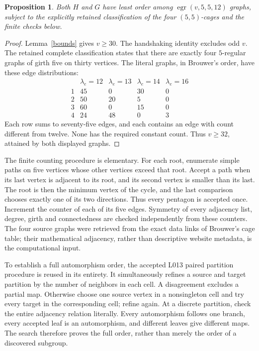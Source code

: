 \documentclass[11pt,a4paper]{article}
\newtheorem{proposition}[theorem]{Proposition}
\begin{document}
\begin{proposition}\label{small}
Both $H$ and $G$ have least order among $\operatorname{egr}(v,5,5,12)$
graphs, subject to the explicitly retained classification of the four
$(5,5)$-cages and the finite checks below.
\end{proposition}
\begin{proof}
Lemma~\ref{bounds} gives $v\geq30$. The handshaking identity excludes
odd $v$. The retained complete classification states that there are
exactly four $5$-regular graphs of girth five on thirty vertices.
The literal graphs, in Brouwer's order, have these edge distributions:
\[
\begin{array}{c|rrrr}
 &\lambda_e=12&\lambda_e=13&\lambda_e=14&\lambda_e=16\\\hline
 1&45&0&30&0\\
 2&50&20&5&0\\
 3&60&0&15&0\\
 4&24&48&0&3
\end{array}
\]
Each row sums to seventy-five edges, and each contains an edge with
count different from twelve. None has the required constant count.
Thus $v\geq32$, attained by both displayed graphs.
\end{proof}

The finite counting procedure is elementary. For each root, enumerate
simple paths on five vertices whose other vertices exceed that root.
Accept a path when its last vertex is adjacent to its root, and its
second vertex is smaller than its last. The root is then the minimum
vertex of the cycle, and the last comparison chooses exactly one of its
two directions. Thus every pentagon is accepted once. Increment the
counter of each of its five edges. Symmetry of every adjacency list,
degree, girth and connectedness are checked independently from these
counters. The four source graphs were retrieved from the exact data
links of Brouwer's cage table; their mathematical adjacency, rather
than descriptive website metadata, is the computational input.

To establish a full automorphism order, the accepted L013 paired
partition procedure is reused in its entirety. It simultaneously
refines a source and target partition by the number of neighbors in
each cell. A disagreement excludes a partial map. Otherwise choose
one source vertex in a nonsingleton cell and try every target in the
corresponding cell; refine again. At a discrete partition, check the
entire adjacency relation literally. Every automorphism follows one
branch, every accepted leaf is an automorphism, and different leaves
give different maps. The search therefore proves the full order,
rather than merely the order of a discovered subgroup.
\end{document}
